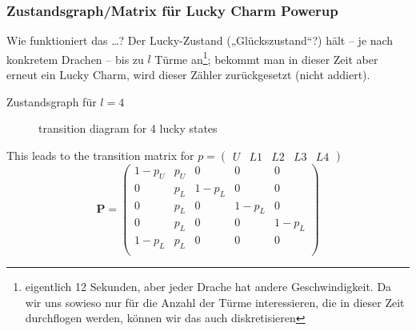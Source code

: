 \documentclass[parskip=half]{scrartcl}
\newcommand{\mat}[1]{\mathbf{#1}}
\begin{document}
\subsubsection{Zustandsgraph/Matrix für Lucky Charm Powerup}
Wie funktioniert das …?
Der Lucky-Zustand („Glückszustand“?) hält – je nach konkretem Drachen – bis zu $l$ Türme an\footnote{eigentlich 12 Sekunden, aber jeder Drache hat andere Geschwindigkeit. Da wir uns sowieso nur für die Anzahl der Türme interessieren, die in dieser Zeit durchflogen werden, können wir das auch diskretisieren}; bekommt man in dieser Zeit aber erneut ein Lucky Charm, wird dieser Zähler zurückgesetzt (nicht addiert).

Zustandsgraph für $l=4$

\begin{figure}
  \centering
{}
  \caption{transition diagram for 4 lucky states}
\end{figure}

This leads to the transition matrix
for $p=\begin{pmatrix}U & L1 & L2 & L3 & L4 \end{pmatrix}$
\[ \mat{P}=\begin{pmatrix}
  1-p_U & p_U & 0 & 0 & 0 \\%
    0 & p_L & 1-p_L & 0 & 0 \\%
    0 & p_L & 0 & 1-p_L & 0 \\ %
    0 & p_L & 0 & 0 & 1-p_L \\   %
  1-p_L & p_L & 0 & 0 & 0 \\   %
\end{pmatrix}
\]
\end{document}
